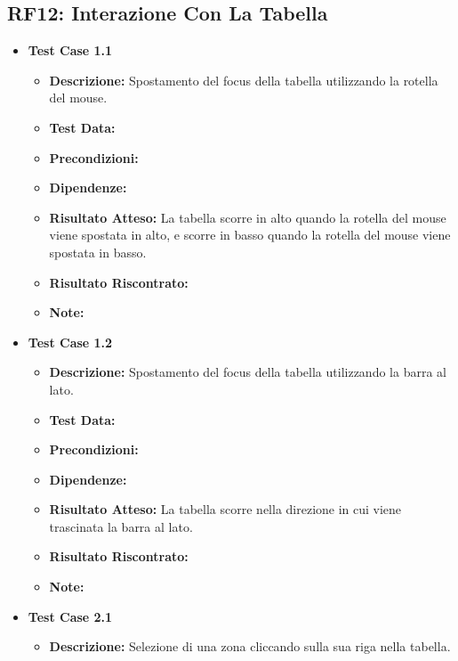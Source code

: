     \subsection{RF12: Interazione Con La Tabella}
        \begin{itemize}
            \item \textbf{Test Case 1.1}
                \begin{itemize}
                    \item \textbf{Descrizione:} Spostamento del focus della tabella utilizzando la rotella del mouse.
                    \item \textbf{Test Data:}
                    \item \textbf{Precondizioni:}
                    \item \textbf{Dipendenze:}
                    \item \textbf{Risultato Atteso:} La tabella scorre in alto quando la rotella del mouse viene spostata in alto, e scorre in basso quando la rotella del mouse viene spostata in basso.
                    \item \textbf{Risultato Riscontrato:}
                    \item \textbf{Note:}
                \end{itemize}
            \item \textbf{Test Case 1.2}
                \begin{itemize}
                    \item \textbf{Descrizione:} Spostamento del focus della tabella utilizzando la barra al lato.
                    \item \textbf{Test Data:}
                    \item \textbf{Precondizioni:}
                    \item \textbf{Dipendenze:}
                    \item \textbf{Risultato Atteso:} La tabella scorre nella direzione in cui viene trascinata la barra al lato.
                    \item \textbf{Risultato Riscontrato:}
                    \item \textbf{Note:}
                \end{itemize}
            \item \textbf{Test Case 2.1}
                \begin{itemize}
                    \item \textbf{Descrizione:} Selezione di una zona cliccando sulla sua riga nella tabella.

\end{itemize}
\end{itemize}
